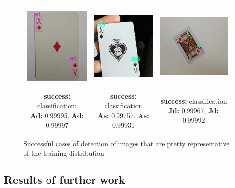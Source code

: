 \documentclass[a4paper]{article}
\begin{document}
\begin{figure}[h]

\begin{tabular}{ccc}

 \includegraphics[height=44mm]{images/ad} &   \includegraphics[height=44mm]{images/as} &   \includegraphics[height=44mm]{images/jd}\\
\makecell{\textbf{success:} classification: \\ \textbf{Ad:} 0.99995, \textbf{Ad:} 0.99997}  & \makecell{\textbf{success:}  classification \\ \textbf{As:} 0.99757, \textbf{As:} 0.99931} & \makecell{\textbf{success:}  classification \\ \textbf{Jd:} 0.99967, \textbf{Jd:} 0.99992}\\[6pt]

\end{tabular}
\caption{Successful cases of detection of images that are pretty representative of the training distribution}
\label{fig:testcases}
\end{figure}


\subsection*{Results of further work}
\end{document}
